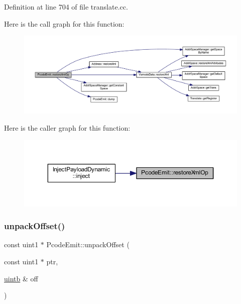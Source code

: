 Definition at line 704 of file translate.\+cc.

Here is the call graph for this function\+:
\nopagebreak
\begin{figure}[H]
\begin{center}
\leavevmode
\includegraphics[width=350pt]{class_pcode_emit_a7e440d43aba89c358ffcab1f2d88b3db_cgraph}
\end{center}
\end{figure}
Here is the caller graph for this function\+:
\nopagebreak
\begin{figure}[H]
\begin{center}
\leavevmode
\includegraphics[width=350pt]{class_pcode_emit_a7e440d43aba89c358ffcab1f2d88b3db_icgraph}
\end{center}
\end{figure}
\mbox{\label{class_pcode_emit_a58dbf8967eef54f79f9e622b69df46a5}} 
\subsubsection{\texorpdfstring{unpackOffset()}{unpackOffset()}}
{\footnotesize\ttfamily const uint1 $\ast$ Pcode\+Emit\+::unpack\+Offset (\begin{DoxyParamCaption}\item[{const uint1 $\ast$}]{ptr,  }\item[{\mbox{\hyperlink{types_8h_a2db313c5d32a12b01d26ac9b3bca178f}{uintb}} \&}]{off }\end{DoxyParamCaption})\hspace{0.3cm}{\ttfamily [static]}}



